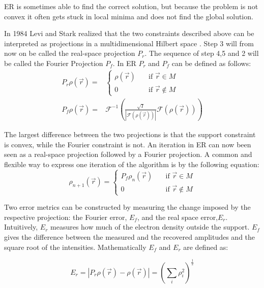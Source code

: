 ER is sometimes able to find the correct solution, but because the problem is not convex it often gets stuck in local minima and does not find the global solution.

In 1984 Levi and Stark realized that the two constraints described above can be interpreted as projections in a multidimensional Hilbert space \cite{Levi1984}. Step 3 will from now on be called the real-space projection $P_r$. The sequence of step 4,5 and 2 will be called the Fourier Projection $P_f$.  In ER $P_r$ and $P_f$ can be defined as follows:
\begin{align}\label{eq:ER}
P_r \rho\left(\vec{r}\right) =& \begin{cases} \rho\left(\vec{r}\right) \quad &\mathrm{if}\,\,
    \vec{r} \in M\\0 \quad & \mathrm{if}\,\, \vec{r} \not\in M \end{cases}\\
P_f \rho(\vec{r}) =& \mathcal{F}^{-1}\left( \frac{\sqrt{I}}{|\mathcal{F}(\rho(\vec{r}))|}\mathcal{F}(\rho(\vec{r})) \right)
\end{align}

The largest difference between the two projections is that the support constraint is convex, while the Fourier constraint is not. An iteration in ER can now been seen as a real-space projection followed by a Fourier projection. A common and flexible way to express one iteration of the algorithm is by the following equation:
\begin{equation}\label{eq:fom}
\rho_{n+1}\left(\vec{r}\right) = \begin{cases} P_f\rho_{n}\left(\vec{r}\right) \quad &\mathrm{if}\,\,
    \vec{r} \in M\\0 \quad & \mathrm{if}\,\, \vec{r} \not\in M \end{cases}
\end{equation}

Two error metrics can be constructed by measuring the change imposed by the respective projection:	the Fourier error, $E_f$, and the real space error,$E_r$. Intuitively, $E_r$ measures how much of the electron density outside the support. $E_f$ gives the difference between the measured and the recovered amplitudes and the square root of the intensities. Mathematically $E_f$ and $E_r$ are defined as:

\begin{equation}
E_r = \left|P_r\rho(\vec{r}) - \rho(\vec{r})\right| = \left(\sum_i\rho_i^2\right)^{\frac{1}{2}}
\end{equation}

